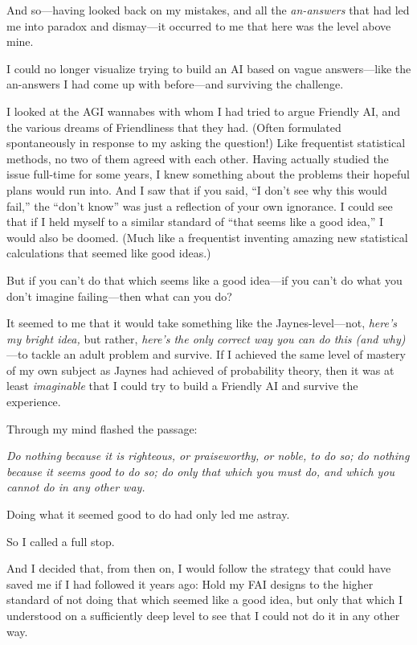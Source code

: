{
 And so---having looked back on my mistakes, and all the
\textit{an-answers} that had led me into paradox and dismay---it
occurred to me that here was the level above mine.}

{
 I could no longer visualize trying to build an AI based on vague
answers---like the an-answers I had come up with before---and surviving
the challenge.}

{
 I looked at the AGI wannabes with whom I had tried to argue
Friendly AI, and the various dreams of Friendliness that they had.
(Often formulated spontaneously in response to my asking the question!)
Like frequentist statistical methods, no two of them agreed with each
other. Having actually studied the issue full-time for some years, I
knew something about the problems their hopeful plans would run into.
And I saw that if you said, ``I don't
see why this would fail,'' the
``don't know'' was
just a reflection of your own ignorance. I could see that if I held
myself to a similar standard of ``that seems like a
good idea,'' I would also be doomed. (Much like a
frequentist inventing amazing new statistical calculations that seemed
like good ideas.)}

{
 But if you can't do that which seems like a good
idea---if you can't do what you don't
imagine failing---then what can you do?}

{
 It seemed to me that it would take something like the
Jaynes-level---not, \textit{here's my bright idea,} but
rather, \textit{here's the only correct way you can do
this (and why)}{}---to tackle an adult problem and survive. If I
achieved the same level of mastery of my own subject as Jaynes had
achieved of probability theory, then it was at least
\textit{imaginable} that I could try to build a Friendly AI and survive
the experience.}

{
 Through my mind flashed the passage:}

{
 \textit{Do nothing because it is righteous, or praiseworthy, or
noble, to do so; do nothing because it seems good to do so; do only
that which you must do, and which you cannot do in any other
way.}}

{
 Doing what it seemed good to do had only led me astray.}

{
 So I called a full stop.}

{
 And I decided that, from then on, I would follow the strategy that
could have saved me if I had followed it years ago: Hold my FAI designs
to the higher standard of not doing that which seemed like a good idea,
but only that which I understood on a sufficiently deep level to see
that I could not do it in any other way.}

